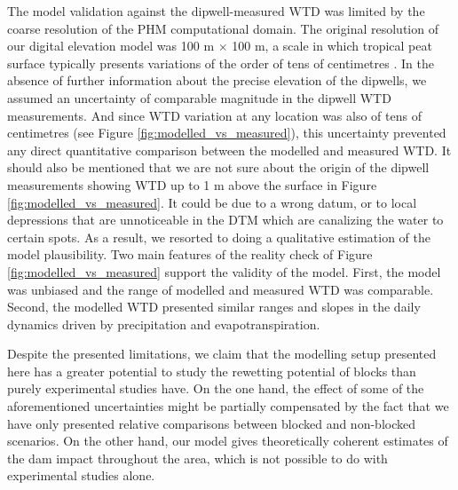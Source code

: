 \documentclass[bg, manuscript]{copernicus}
\begin{document}
The model validation against the dipwell-measured WTD was limited by the coarse resolution of the PHM computational domain.
The original resolution of our digital elevation model was 100 \unit{m} $\times$ 100 \unit{m}, a scale in which tropical peat surface typically presents variations of the order of tens of centimetres \citep{lampelaGroundSurfaceMicrotopography2016}.
In the absence of further information about the precise  elevation of the dipwells, we assumed an uncertainty of comparable magnitude in the dipwell WTD measurements.
And since WTD  variation at any location was also of  tens of centimetres (see Figure \ref{fig:modelled_vs_measured}), this uncertainty prevented any direct quantitative comparison between the modelled and measured WTD.
It should also be mentioned that we are not sure about the origin of the dipwell measurements showing WTD up to 1 m above the surface in Figure \ref{fig:modelled_vs_measured}.
It could be due to a wrong datum, or to local depressions that are unnoticeable in the DTM which are canalizing the water to certain spots.
As a result, we  resorted to doing a qualitative estimation of the model plausibility.
Two main features of the reality check of Figure \ref{fig:modelled_vs_measured} support the validity of the model.
First, the model was unbiased and the range of modelled and measured WTD was comparable.
Second,  the modelled WTD presented similar ranges and slopes in the daily dynamics driven by precipitation and evapotranspiration.


Despite the presented limitations, we claim that the modelling setup presented here has a greater potential to study the rewetting potential of blocks than purely experimental studies have.
On the one hand, the effect of some of the aforementioned uncertainties might be partially compensated by the fact that we have only presented relative comparisons between blocked and non-blocked scenarios.
On the other hand, our model gives theoretically coherent estimates of the dam impact throughout the area, which is not possible to do  with  experimental studies alone.
\end{document}

